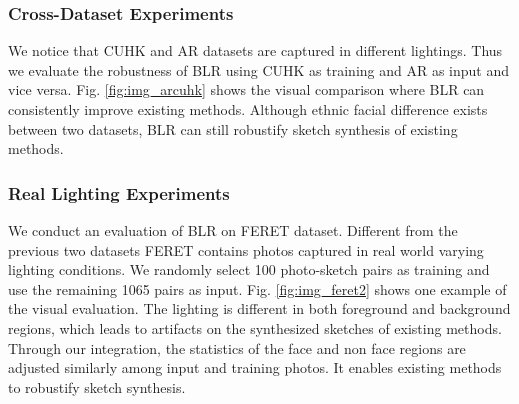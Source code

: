 \documentclass{article}
\begin{document}
\subsubsection{Cross-Dataset Experiments}
We notice that CUHK and AR datasets are captured in different lightings. Thus we evaluate the robustness of BLR using CUHK as training and AR as input and vice versa. Fig. \ref{fig:img_arcuhk} shows the visual comparison where BLR can consistently improve existing methods. Although ethnic facial difference exists between two datasets, BLR can still robustify sketch synthesis of existing methods.


\subsubsection{Real Lighting Experiments}
We conduct an evaluation of BLR on FERET dataset. Different from the previous two datasets FERET contains photos captured in real world varying lighting conditions. We randomly select 100 photo-sketch pairs as training and use the remaining 1065 pairs as input. Fig. \ref{fig:img_feret2} shows one example of the visual evaluation. The lighting is different in both foreground and background regions, which leads to artifacts on the synthesized sketches of existing methods. Through our integration, the statistics of the face and non face regions are adjusted similarly among input and training photos. It enables existing methods to robustify sketch synthesis.
\end{document}
